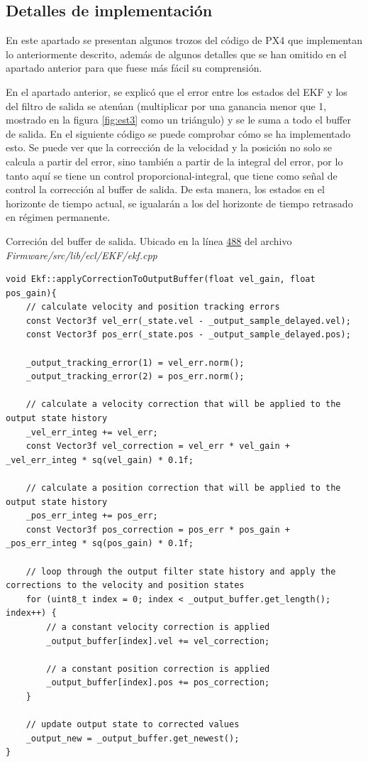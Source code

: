 \subsection{Detalles de implementación}
En este apartado se presentan algunos trozos del código de PX4 que implementan lo anteriormente descrito, además de algunos detalles que se han omitido en el apartado anterior para que fuese más fácil su comprensión.

En el apartado anterior, se explicó que el error entre los estados del EKF y los del filtro de salida se atenúan (multiplicar por una ganancia menor que 1, mostrado en la figura \ref{fig:est3} como un triángulo) y se le suma a todo el buffer de salida. En el siguiente código se puede comprobar cómo se ha implementado esto. Se puede ver que la corrección de la velocidad y la posición no solo se calcula a partir del error, sino también a partir de la integral del error, por lo tanto aquí se tiene un control proporcional-integral, que tiene como señal de control la corrección al buffer de salida. De esta manera, los estados en el horizonte de tiempo actual, se igualarán a los del horizonte de tiempo retrasado en régimen permanente. 

\begin{codigo}{Correción del buffer de salida. Ubicado en  la línea \href{https://github.com/PX4/PX4-ECL/blob/ec934908900b23ee273d1a9f82364b7b38423200/EKF/ekf.cpp\#L488}{488} del archivo \textit{Firmware/src/lib/ecl/EKF/ekf.cpp}}
\begin{verbatim}
void Ekf::applyCorrectionToOutputBuffer(float vel_gain, float pos_gain){
	// calculate velocity and position tracking errors
	const Vector3f vel_err(_state.vel - _output_sample_delayed.vel);
	const Vector3f pos_err(_state.pos - _output_sample_delayed.pos);

	_output_tracking_error(1) = vel_err.norm();
	_output_tracking_error(2) = pos_err.norm();

	// calculate a velocity correction that will be applied to the output state history
	_vel_err_integ += vel_err;
	const Vector3f vel_correction = vel_err * vel_gain + _vel_err_integ * sq(vel_gain) * 0.1f;

	// calculate a position correction that will be applied to the output state history
	_pos_err_integ += pos_err;
	const Vector3f pos_correction = pos_err * pos_gain + _pos_err_integ * sq(pos_gain) * 0.1f;

	// loop through the output filter state history and apply the corrections to the velocity and position states
	for (uint8_t index = 0; index < _output_buffer.get_length(); index++) {
		// a constant velocity correction is applied
		_output_buffer[index].vel += vel_correction;

		// a constant position correction is applied
		_output_buffer[index].pos += pos_correction;
	}

	// update output state to corrected values
	_output_new = _output_buffer.get_newest();
}
\end{verbatim}
\end{codigo} 

